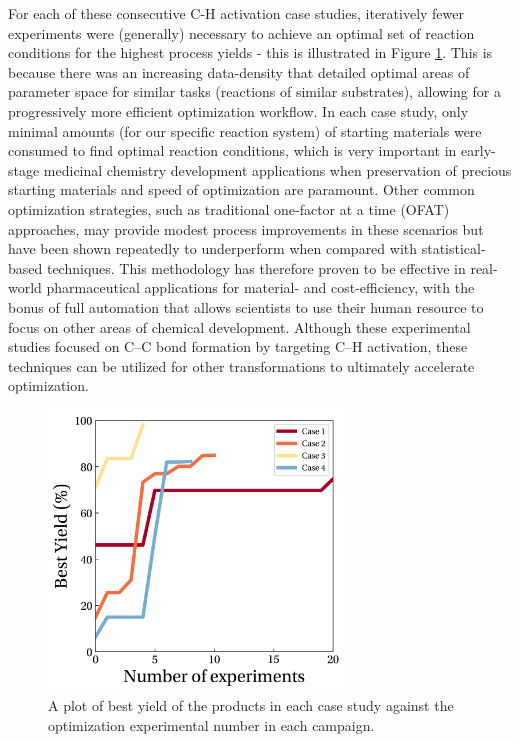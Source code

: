 For each of these consecutive C-H activation case studies, iteratively fewer experiments were (generally) necessary to achieve an optimal set of reaction conditions for the highest process yields - this is illustrated in Figure \ref{fig:optimization_curves}. This is because there was an increasing data-density that detailed optimal areas of parameter space for similar tasks (reactions of similar substrates), allowing for a progressively more efficient optimization workflow. In each case study, only minimal amounts (for our specific reaction system) of starting materials were consumed to find optimal reaction conditions, which is very important in early-stage medicinal chemistry development applications when preservation of precious starting materials and speed of optimization are paramount. Other common optimization strategies, such as traditional one-factor at a time (OFAT) approaches, may provide modest process improvements in these scenarios but have been shown repeatedly to underperform when compared with statistical-based techniques. This methodology has therefore proven to be effective in real-world pharmaceutical applications for material- and cost-efficiency, with the bonus of full automation that allows scientists to use their human resource to focus on other areas of chemical development. Although these experimental studies focused on C--C bond formation by targeting C--H activation, these techniques can be utilized for other transformations to ultimately accelerate optimization.

\begin{figure}
    \centering
    \includegraphics[width=0.7\textwidth]{gfx/Chapter04/ch_activation_optimization_curves.png}
    \caption{A plot of best yield of the products in each case study against the optimization experimental number in each campaign.}
    \label{fig:optimization_curves}
\end{figure}


